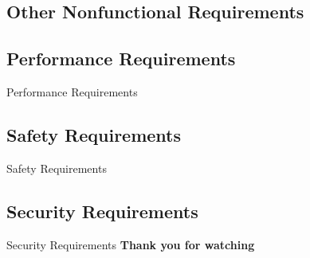 \documentclass{article}
\begin{document}
\begin{CJK}{UTF8}{bkai}
\section{\huge\bf  \color {blue}  Other Nonfunctional Requirements }
\subsection{ \Large Performance Requirements}
 Performance Requirements
\newpage
\subsection{\Large Safety Requirements }
Safety Requirements
\newpage
\subsection{ \Large Security Requirements }
 Security Requirements
\newpage
\Huge\bf   Thank you for watching


\end{CJK}
\end{document}
